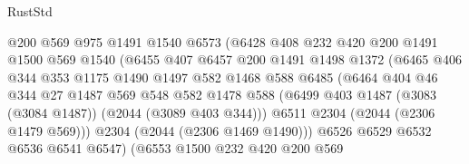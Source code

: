 \begin{lexlean}{RustStd}
\begin{coremodule}
{\begin{coremodule}
{{{{{{{{{{{{{{                            @200
                            @569
                            @975
                            @1491
                            @1540
                            @6573
                            (@6428
                              @408
                              @232
                              @420
                              @200
                              @1491
                              @1500
                              @569
                              @1540
                              (@6455
                                @407
                                @6457
                                @200
                                @1491
                                @1498
                                @1372
                                (@6465
                                  @406
                                  @344
                                  @353
                                  @1175
                                  @1490
                                  @1497
                                  @582
                                  @1468
                                  @588
                                  @6485
                                  (@6464
                                    @404
                                    @46
                                    @344
                                    @27
                                    @1487
                                    @569
                                    @548
                                    @582
                                    @1478
                                    @588
                                    (@6499
                                      @403
                                      @1487
                                      (@3083 (@3084 @1487))
                                      (@2044 (@3089 @403 @344)))
                                    @6511
                                    @2304
                                    (@2044 (@2306 @1479 @569)))
                                  @2304
                                  (@2044 (@2306 @1469 @1490)))
                                @6526
                                @6529
                                @6532
                                @6536
                                @6541
                                @6547)
                              (@6553
                                @1500
                                @232
                                @420
                                @200
                                @569
}}}}}}}}}}}}}}
\end{coremodule}}
\end{coremodule}
\end{lexlean}
